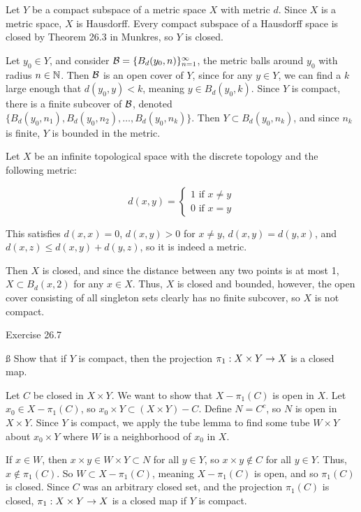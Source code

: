 \documentclass{hmwk}
\begin{document}
\begin{solution}

\pre Let $Y$ be a compact subspace of a metric space $X$ with metric $d$. Since $X$ is a metric space, $X$ is Hausdorff. Every compact subspace of a Hausdorff space is closed by Theorem 26.3 in Munkres, so $Y$ is closed. 

\pre Let $y_0 \in Y$, and consider $\mathcal{B} = \{B_d(y_0, n)\}_{n=1}^\infty$, the metric balls around $y_0$ with radius $n \in \mathbb{N}$. Then $\mathcal{B}$ is an open cover of $Y$, since for any $y \in Y$, we can find a $k$ large enough that $d(y_0, y) < k$, meaning $y \in B_d(y_0, k)$. Since $Y$ is compact, there is a finite subcover of $\mathcal{B}$, denoted $\{B_{d}(y_0, n_1), B_{d}(y_0, n_2), \dots, B_{d}(y_0, n_k)\}$. Then $Y \subset B_{d}(y_0, n_k)$, and since $n_k$ is finite, $Y$ is bounded in the metric.

\pre Let $X$ be an infinite topological space with the discrete topology and the following metric:

$$d(x, y) = \begin{cases}
    1 \text{ if } x \neq y \\
    0 \text{ if } x = y
\end{cases}
$$

\pre This satisfies $d(x, x) = 0$, $d(x, y) > 0$ for $x \neq y$, $d(x, y) = d(y, x)$, and $d(x, z) \leq d(x, y) + d(y, z)$, so it is indeed a metric. 

\pre Then $X$ is closed, and since the distance between any two points is at most 1, $X \subset B_d(x, 2)$ for any $x \in X$. Thus, $X$ is closed and bounded, however, the open cover consisting of all singleton sets clearly has no finite subcover, so $X$ is not compact.

\end{solution}

\begin{problem}{Exercise 26.7}

    \ss
    \noindent Show that if $Y$ is compact, then the projection $\pi_1: X \times Y \rightarrow X$ is a closed map. 
\end{problem}

\begin{solution}

\pre Let $C$ be closed in $X \times Y$. We want to show that $X - \pi_1(C)$ is open in $X$. Let $x_0 \in X - \pi_1(C)$, so $x_0 \times Y \subset (X \times Y) - C$. Define $N = C^c$, so $N$ is open in $X \times Y$. Since $Y$ is compact, we apply the tube lemma to find some tube $W \times Y$ about $x_0 \times Y$ where $W$ is a neighborhood of $x_0$ in $X$. 

\pre If $x \in W$, then $x \times y \in W \times Y \subset N$ for all $y \in Y$, so $x \times y \notin C$ for all $y \in Y$. Thus, $x \notin \pi_1(C)$. So $W \subset X - \pi_1(C)$, meaning $X - \pi_1(C)$ is open, and so $\pi_1(C)$ is closed. Since $C$ was an arbitrary closed set, and the projection $\pi_1(C)$ is closed, $\pi_1: X \times Y \rightarrow X$ is a closed map if $Y$ is compact.
\end{solution}
\end{document}
